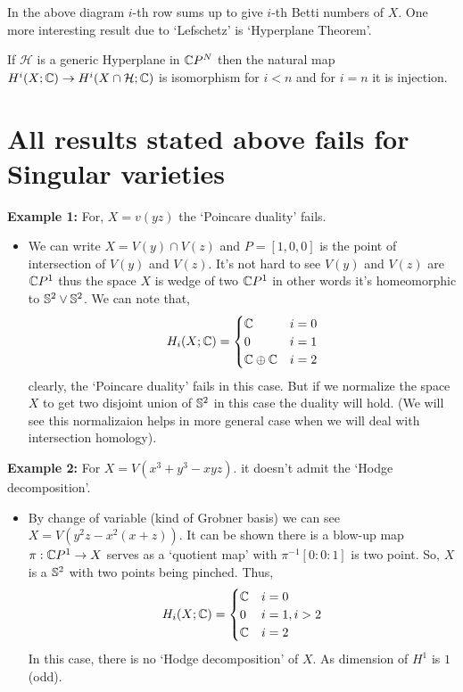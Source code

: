 \documentclass[11pt]{article}
\begin{document}
\noindent In the above diagram $i$-th row sums up to give $i$-th Betti numbers of $X$. One more interesting result due to `Lefschetz' is `Hyperplane Theorem'.

\begin{Thm}{}{}
    If $\mathcal{H}$ is a generic Hyperplane in $\mathbb{C} P^N$ then the natural map $H^i(X;\mathbb{C}) \to H^i(X\cap \mathcal{H};\mathbb{C})$ is isomorphism for $i<n$ and for $i=n$ it is injection. 
\end{Thm}

\section{All results stated above fails for Singular varieties}

\textbf{Example 1:} For, $X = v(yz)$ the `Poincare duality' fails.
\begin{itemize}
    \item[] We can write $X= V(y)\cap V(z)$ and $P =[1,0,0]$ is the point of intersection of $V(y)$ and $V(z)$. It's not hard to see $V(y)$ and $V(z)$ are $\mathbb{C} P^1$ thus the space $X$ is wedge of two $\mathbb{C} P^1$ in other words it's homeomorphic to $\mathbb{S}^2 \vee \mathbb{S}^2$. We can note that,\[H_i(X;\mathbb{C})=\begin{cases}
        \mathbb{C} & i=0\\
        0 & i=1 \\
        \mathbb{C} \oplus \mathbb{C} & i=2 
        \end{cases}\]
    clearly, the `Poincare duality' fails in this case. But if we normalize the space $X$ to get two disjoint union of $\mathbb{S}^2$ in this case the duality will hold. (We will see this normalizaion helps in more general case when we will deal with intersection homology).    
\end{itemize}
\textbf{Example 2:} For $X = V(x^3+y^3-xyz)$. it doesn't admit the `Hodge decomposition'.
\begin{itemize}
    \item[] By change of variable (kind of Grobner basis) we can see $X= V(y^2z-x^2(x+z))$. It can be shown there is a blow-up map $\pi :\mathbb{C} P^1\to X$ serves as a `quotient map' with $\pi^{-1}{[0:0:1]}$ is two point. So, $X$ is a $\mathbb{S}^2$ with two points being pinched. Thus, \[H_i(X;\mathbb{C})=\begin{cases}
        \mathbb{C} & i=0\\
        0 & i=1, i>2 \\
        \mathbb{C}  & i=2 
        \end{cases}\]
    In this case, there is no `Hodge decomposition' of $X$. As dimension of $H^1$ is $1$(odd).
\end{itemize}
\end{document}
